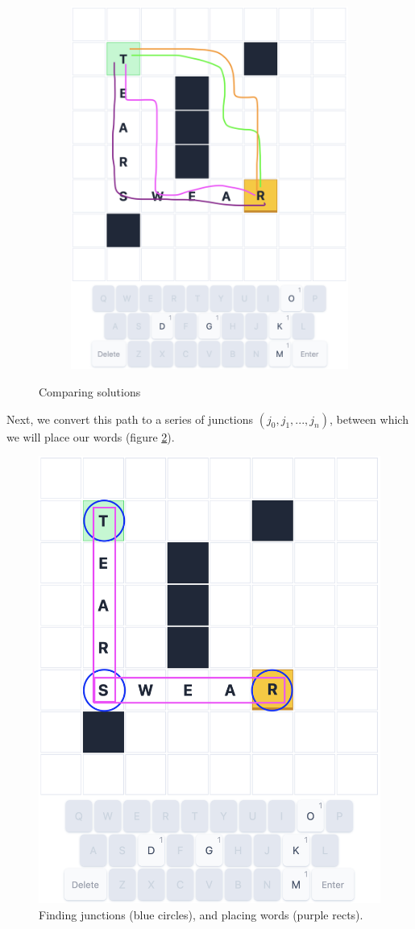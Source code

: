 \documentclass{article}
\begin{document}
\begin{figure}
\begin{subfigure}{0.5\textwidth}
  \includegraphics[width=0.8\linewidth]{min-dist.png}
\end{subfigure}
\caption{Comparing solutions}
\label{fig:min-turns-vs-min-distances}
\end{figure}

Next, we convert this path to a series of junctions $(j_0, j_1, ..., j_n)$, between which we will
place our words (figure \ref{fig:junctions}).

\begin{figure}
\centering
  \includegraphics[width=0.4\linewidth]{sol-junctions.png}
\caption{Finding junctions (blue circles), and placing words (purple rects).}
\label{fig:junctions}
\end{figure}
\end{document}
